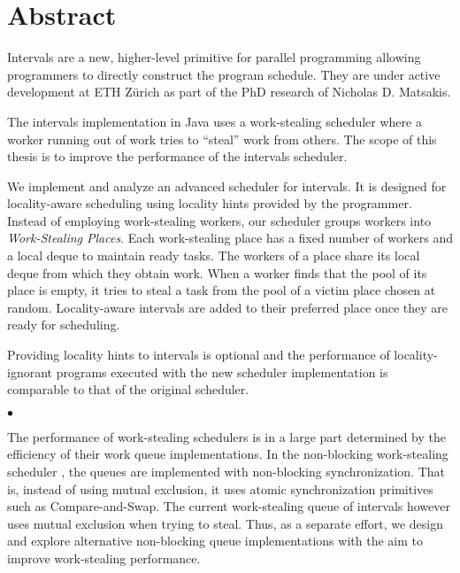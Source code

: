 
\chapter*{Abstract}
\label{chap:abstract}

Intervals are a new, higher-level primitive for parallel programming
allowing programmers to directly construct the program schedule. They
are under active development at ETH Zürich as part of the PhD research
of Nicholas D. Matsakis.

The intervals implementation in Java uses a work-stealing scheduler
where a worker running out of work tries to ``steal'' work from
others. The scope of this thesis is to improve the performance of the
intervals scheduler.

We implement and analyze an advanced scheduler for intervals. It is
designed for locality-aware scheduling using locality hints provided
by the programmer. Instead of employing work-stealing workers, our
scheduler groups workers into \emph{Work-Stealing Places}. Each
work-stealing place has a fixed number of workers and a local deque to
maintain ready tasks. The workers of a place share its local deque
from which they obtain work. When a worker finds that the pool of its
place is empty, it tries to steal a task from the pool of a victim
place chosen at random. Locality-aware intervals are added to their
preferred place once they are ready for scheduling. 

Providing locality hints to intervals is optional and the performance
of locality-ignorant programs executed with the new scheduler
implementation is comparable to that of the original scheduler.

\begin{center}
  $\bullet$
\end{center}

The performance of work-stealing schedulers is in a large part
determined by the efficiency of their work queue implementations. In
the non-blocking work-stealing scheduler \cite{Arora1998}, the queues
are implemented with non-blocking synchronization. That is, instead of
using mutual exclusion, it uses atomic synchronization primitives such
as Compare-and-Swap. The current work-stealing queue of intervals
however uses mutual exclusion when trying to steal. Thus, as a
separate effort, we design and explore alternative non-blocking queue
implementations with the aim to improve work-stealing performance.


